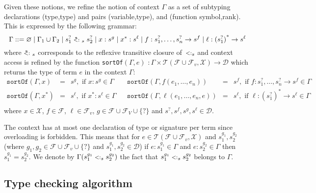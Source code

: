 \documentclass{eptcs}
\newcommand{\TT}{\ensuremath{\mathcal{T}}\xspace}
\newcommand{\XX}{\ensuremath{\mathcal{X}}\xspace}
\newcommand{\caD}{\ensuremath{\mathcal{D}}\xspace}
\newcommand{\caF}{\ensuremath{\mathcal{F}}\xspace}
\newcommand{\TFVX}{\ensuremath{\TT(\caF \cup \caF_v,\XX)}\xspace}
\newcommand{\xx}{\ensuremath{x^*}\xspace}
\newcommand{\sub}{\mathrel{\mbox{{\footnotesize $<:$}}}}
\newcommand{\transsub}{\mathrel{\mbox{$\sub\hspace{-1em}\footnotesize{^*}~~$}}}
\newcommand{\sortof}[2]{\texttt{sortOf}\ensuremath{(#1,#2)}}
\newcommand{\sig}[2]{\ensuremath{{#1}\rightarrow{#2}}}
\newcommand{\vsig}[2]{\ensuremath{{#1}^*\rightarrow{#2}}}
\begin{document}
Given these notions, we refine the notion of context $\Gamma$ as a set of subtyping
declarations (type,type) and pairs (variable,type), and (function symbol,rank). This is
expressed by the following grammar:
$$
\Gamma ::= 
      \varnothing 
      \mid \Gamma_1 \cup \Gamma_2
      \mid s_1^? \transsub_s s_2^?
      \mid x : s^g 
      \mid x^*: s^{\ell} 
      \mid f : \sig{s_1^?, \ldots,s_n^?}{s^f}
      \mid \ell : \vsig{(s_1^?)}{s^{\ell}}
$$
where $\transsub_s$ corresponds to the reflexive transitive closure of~$\sub_s$ and context access is refined by the function \sortof{\Gamma}{e} $ : \Gamma \times
\TFVX \rightarrow \caD$ which returns the type of term $e$ in the context $\Gamma$:
$$
\begin{array}{rclcrcl}
        \sortof{\Gamma}{x}              
        &=& s^g, \textrm{ if } x : s^g \in \Gamma
        & &
        \sortof{\Gamma}{f(e_1,\ldots,e_n)}      
        &=& s^f, \textrm{ if } f : \sig{s_1^?, \ldots, s_n^?}{s^f} \in \Gamma    \\
        \sortof{\Gamma}{\xx}    
        &=& s^{\ell}, \textrm{ if } x^* : s^{\ell} \in \Gamma
        & &
        \sortof{\Gamma}{\ell(e_1,\ldots,e_n,e)}
        &=& s^{\ell}, \textrm{ if } \ell : \vsig{(s_1^?)}{s^{\ell}} \in \Gamma     \\
\end{array}
$$
where $x \in \XX$, $f \in \caF$, $\ell \in \caF_v$, $g \in \caF\cup\caF_V\cup\{?\}$ and
$s^?,s^f,s^g,s^{\ell} \in \caD$.
 
The context has at most one declaration of type or signature per term since overloading is
forbidden. This means that for $e \in \TFVX$ and $s_1^{g_1}, s_2^{g_2}$ (where
$g_1,g_2 \in \caF\cup\caF_v\cup\{?\}$ and $s_1^{g_1}, s_2^{g_2}
\in \caD$) if $e : s_1^{g_1} \in
\Gamma$ and $e : s_2^{g_2} \in \Gamma$ then $s_1^{g_1} = s_2^{g_2}$. We denote
by $\Gamma(s_1^{g_1} \sub_s s_2^{g_2})$
the fact that $s_1^{g_1} \sub_s s_2^{g_2}$
 belongs to $\Gamma$.

\subsection{Type checking algorithm}
\label{subsec:checking_algo}
\end{document}
